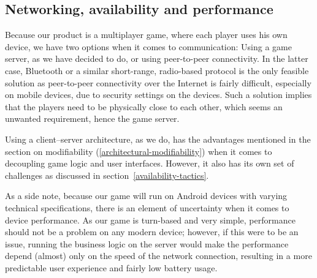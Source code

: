 \subsection{Networking, availability and performance}
Because our product is a multiplayer game, where each player uses his own device, we have two options when it comes to communication: Using a game server, as we have decided to do, or using peer-to-peer connectivity. In the latter case, Bluetooth or a similar short-range, radio-based protocol is the only feasible solution as peer-to-peer connectivity over the Internet is fairly difficult, especially on mobile devices, due to security settings on the devices. Such a solution implies that the players need to be physically close to each other, which seems an unwanted requirement, hence the game server.

Using a client--server architecture, as we do, has the advantages mentioned in the section on modifiability (\ref{architectural-modifiability}) when it comes to decoupling game logic and user interfaces. However, it also has its own set of challenges as discussed in section~\ref{availability-tactics}.

As a side note, because our game will run on Android devices with varying technical specifications, there is an element of uncertainty when it comes to device performance. As our game is turn-based and very simple, performance should not be a problem on any modern device; however, if this were to be an issue, running the business logic on the server would make the performance depend (almost) only on the speed of the network connection, resulting in a more predictable user experience and fairly low battery usage.